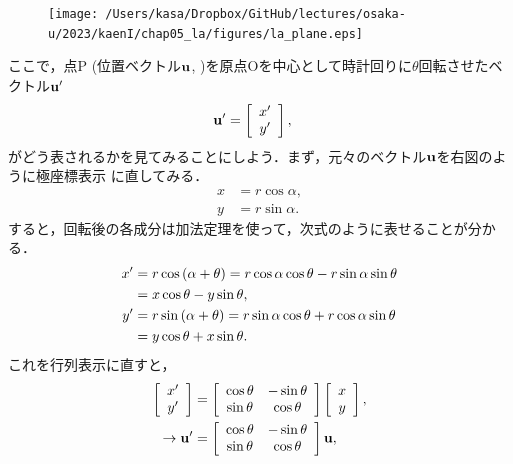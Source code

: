 %
\begin{figure}
\centering
\vspace*{-\intextsep}
\texttt{[image: /Users/kasa/Dropbox/GitHub/lectures/osaka-u/2023/kaenI/chap05\_la/figures/la\_plane.eps]}  
\end{figure}
ここで，点P (位置ベクトル${\bf u}$, )を原点Oを中心として時計回りに$\theta$回転させたベクトル${\bf u}^{\prime}$
%
\begin{align}
{\bf u}^{\prime} & =\left[\begin{array}{c}
x^{\prime}\\
y^{\prime}
\end{array}\right], 
\end{align}
%
がどう表されるかを見てみることにしよう．まず，元々のベクトル${\bf u}$を右図のように極座標表示
に直してみる．
%
\begin{align}
x & =r\cos\alpha,\\
y & =r\sin\alpha.
\end{align}
%
すると，回転後の各成分は加法定理を使って，次式のように表せることが分かる．
%
\begin{align}
x^{\prime} & =r\cos\left(\alpha+\theta\right)=r\cos\alpha\cos\theta-r\sin\alpha\sin\theta\notag\\
 & =x\cos\theta-y\sin\theta,\\
y^{\prime} & =r\sin\left(\alpha+\theta\right)=r\sin\alpha\cos\theta+r\cos\alpha\sin\theta\notag\\
 & =y\cos\theta+x\sin\theta.
\end{align}
%
これを行列表示に直すと，
%
\begin{align}
\left[\begin{array}{c}
x^{\prime}\\
y^{\prime}
\end{array}\right] & =\left[\begin{array}{cc}
\cos\theta & -\sin\theta\\
\sin\theta & \cos\theta
\end{array}\right]\left[\begin{array}{c}
x\\
y
\end{array}\right], \\
\rightarrow
{\bf u}^{\prime} & =\left[\begin{array}{cc}
\cos\theta & -\sin\theta\\
\sin\theta & \cos\theta
\end{array}\right]{\bf u}, 
\end{align}
